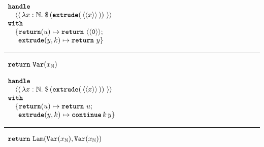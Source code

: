 \begin{code}
  \begin{efflst}
    $\begin{array}{l}
      \textbf{\texttt{handle}} \\
      \quad \equote[\, {\lambda x:\mathbb{N}.\; \splice[\, {(\textbf{\texttt{extrude}}(\, \equote[x] \, ))}\, ]} \, ] \\
      \textbf{\texttt{with}} \\
      \quad \{ \textbf{\texttt{return}}(u) \mapsto {\return{\equote[\texttt{0}]}}; \\
      \quad \; \, \textbf{\texttt{extrude}}(y, k) \mapsto {\return{y}}\}\\
    \end{array}$
  
    \vspace{2mm} 
  \textcolor{effComment}{\hrule height 0.2mm \relax}
  \vspace{2mm} 
  
  \textcolor{effComment}{$\begin{array}{l}\return{\Var{x}{\mathbb{N}}}\end{array}$}
  
  \end{efflst}
  \label{listing:efflang-scope-extrusion}
  \end{code}

  \begin{code}
  \begin{efflst}
    $\begin{array}{l}
      \textbf{\texttt{handle}} \\
      \quad \equote[\, {\lambda x:\mathbb{N}.\; \splice[\, {(\textbf{\texttt{extrude}}(\, \equote[x] \, ))}\, ]} \, ] \\
      \textbf{\texttt{with}} \\
      \quad \{ \textbf{\texttt{return}}(u) \mapsto {\return{u}}; \\
      \quad \; \, \textbf{\texttt{extrude}}(y, k) \mapsto {\continue{k}{y}}\}\\
    \end{array}$

    \vspace{2mm} 
\textcolor{effComment}{\hrule height 0.2mm \relax}
\vspace{2mm} 

\textcolor{effComment}{$\begin{array}{l}\return{\Lam{\Var{x}{\mathbb{N}}}{\Var{x}{\mathbb{N}}}}\end{array}$}

\end{efflst}
%
\label{listing:efflang-maybe-scope-extrusion}
\end{code}

